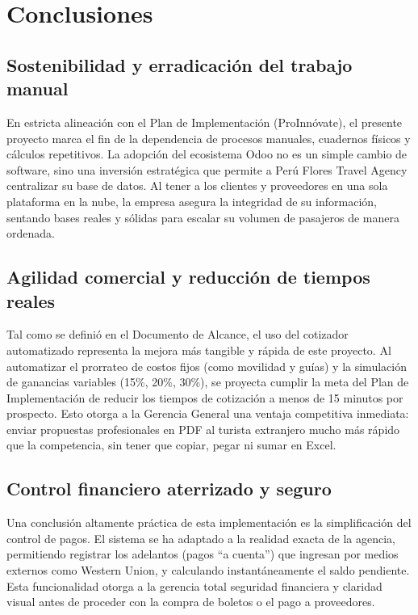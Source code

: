 \section{Conclusiones}

\subsection{Sostenibilidad y erradicación del trabajo manual}
\begin{indentedsubsection}
En estricta alineación con el Plan de Implementación (ProInnóvate), el presente proyecto marca el fin de la dependencia de procesos manuales, cuadernos físicos y cálculos repetitivos. La adopción del ecosistema Odoo no es un simple cambio de software, sino una inversión estratégica que permite a Perú Flores Travel Agency centralizar su base de datos. Al tener a los clientes y proveedores en una sola plataforma en la nube, la empresa asegura la integridad de su información, sentando bases reales y sólidas para escalar su volumen de pasajeros de manera ordenada.
\end{indentedsubsection}

\subsection{Agilidad comercial y reducción de tiempos reales}
\begin{indentedsubsection}
Tal como se definió en el Documento de Alcance, el uso del cotizador automatizado representa la mejora más tangible y rápida de este proyecto. Al automatizar el prorrateo de costos fijos (como movilidad y guías) y la simulación de ganancias variables (15\%, 20\%, 30\%), se proyecta cumplir la meta del Plan de Implementación de reducir los tiempos de cotización a menos de 15 minutos por prospecto. Esto otorga a la Gerencia General una ventaja competitiva inmediata: enviar propuestas profesionales en PDF al turista extranjero mucho más rápido que la competencia, sin tener que copiar, pegar ni sumar en Excel.
\end{indentedsubsection}

\subsection{Control financiero aterrizado y seguro}
\begin{indentedsubsection}
Una conclusión altamente práctica de esta implementación es la simplificación del control de pagos. El sistema se ha adaptado a la realidad exacta de la agencia, permitiendo registrar los adelantos (pagos ``a cuenta'') que ingresan por medios externos como Western Union, y calculando instantáneamente el saldo pendiente. Esta funcionalidad otorga a la gerencia total seguridad financiera y claridad visual antes de proceder con la compra de boletos o el pago a proveedores.
\end{indentedsubsection}

